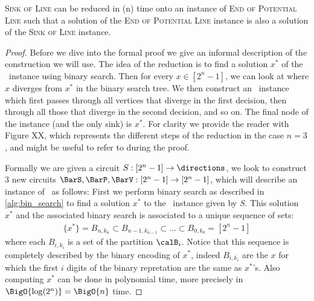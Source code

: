 \begin{theorem}[$\SOL \subset \EOPL$]
    \textsc{Sink of Line} can be reduced in \poly(n) time onto an instance of \textsc{End of Potential Line} such that a solution of the \textsc{End of
        Potential Line} instance is also a solution of the \textsc{Sink of Line} instance.
\end{theorem}
\begin{proof}
    Before we dive into the formal proof we give an informal description of the construction we will use.
    The idea of the reduction is to find a solution $x^*$ of the \SOL\ instance using binary search.
    Then for every $x \in [2^n - 1]$, we can look at where $x$ diverges from $x^*$ in the binary search tree.
    We then construct an \EOPL\ instance which first passes through all vertices that diverge in the first decision, then through all those that diverge in the
    second decision, and so on.
    The final node of the instance (and the only sink) is $x^*$.
    For clarity we provide the reader with Figure XX, which represents the different steps of the reduction in the case $n=3$, and might be useful to refer to
    during the proof.

    Formally we are given a circuit $S: [2^n -1] \rightarrow \directions$, we look to construct 3 new circuits $\BarS, \BarP, \BarV : [2^n - 1] \rightarrow
        [2^n - 1]$, which will describe an instance of \EOPL\ as follows:
    First we perform binary search as described in \cref{alg:bin_search} to find a solution $x^*$ to the \SOL\ instance given by $S$.
    This solution $x^*$ and the associated binary search is associated to a unique sequence of sets:
    \begin{align*}
        \{x^*\} = B_{n, k_n} \subset B_{n-1, k_{n-1}} \subset \dots \subset B_{0, k_0} = [2^n - 1]
    \end{align*}
    where each $B_{i, k_i}$ is a set of the partition $\calB_i$.
    Notice that this sequence is completely described by the binary encoding of $x^*$, indeed $B_{i, k_i}$ are the $x$ for which the first $i$ digits of the
    binary repretation are the same as $x^*$'s.
    Also computing $x^*$ can be done in polynomial time, more precisely in $\BigO{\log(2^n)}=\BigO{n}$ time.


\end{proof}
